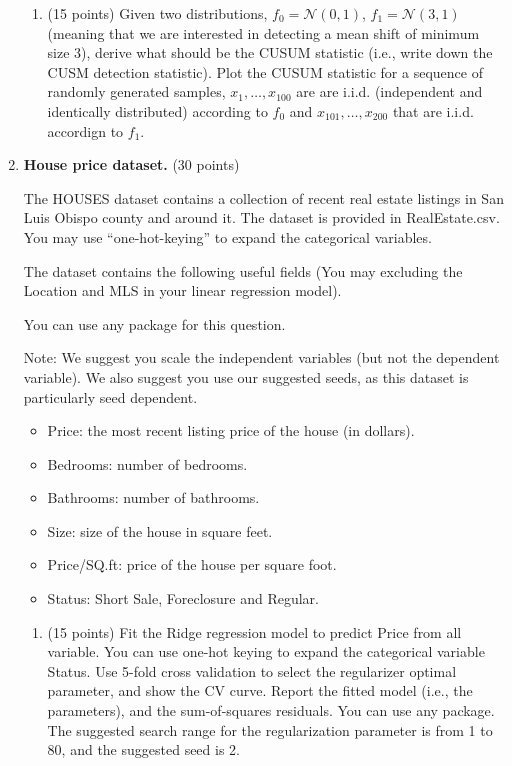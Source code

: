\documentclass[twoside,10pt]{article}
\begin{document}
\begin{enumerate}
\begin{enumerate}
\item  (15 points)  Given two distributions, $f_0 = \mathcal{N}(0, 1)$, $f_1 = \mathcal{N}(3, 1)$ (meaning that we are interested in detecting a mean shift of minimum size 3), derive what should be the CUSUM statistic (i.e., write down the CUSM detection statistic). Plot the CUSUM statistic for a sequence of randomly generated samples, $x_1, \ldots, x_{100}$ are are i.i.d. (independent and identically distributed) according to $f_0$ and $x_{101}, \ldots, x_{200}$  that are i.i.d. accordign to $f_1$.

\end{enumerate}

\clearpage

\item {\bf House price dataset.} (30 points)

The HOUSES dataset contains a collection of recent real estate listings in San Luis Obispo county and around it. The dataset is provided in RealEstate.csv. You may use ``one-hot-keying'' to expand the categorical variables.

The dataset contains the following useful fields (You may excluding the \textsf{Location} and \textsf{MLS} in your linear regression model). 

You can use any package for this question. 

Note: We suggest you scale the independent variables (but not the dependent variable). We also suggest you use our suggested seeds, as this dataset is particularly seed dependent. 

\begin{itemize}
\item Price: the most recent listing price of the house (in dollars).
\item Bedrooms: number of bedrooms.
\item Bathrooms: number of bathrooms.
\item Size: size of the house in square feet.
\item Price/SQ.ft: price of the house per square foot.
\item Status: Short Sale, Foreclosure and Regular.
\end{itemize}

\begin{enumerate}

\item (15 points) Fit the Ridge regression model to predict \textsf{Price} from all variable. You can use one-hot keying to expand the categorical variable \textsf{Status}. Use 5-fold cross validation to select the regularizer optimal parameter, and show the CV curve. Report the fitted model (i.e., the parameters), and the sum-of-squares residuals.  You can use any package. The suggested search range for the regularization parameter is from 1 to 80, and the suggested seed is 2.
 

\end{enumerate}
\end{enumerate}
\end{document}
